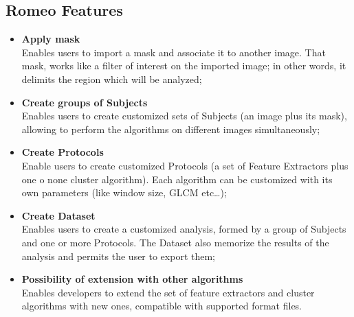 \subsection{Romeo Features}
\label{features}
\begin{itemize}
\item \textbf{Apply mask\\} Enables users to import a mask and associate it to another image. That mask, works like a filter of interest on the imported image; in other words, it delimits the region which will be analyzed;
\item \textbf{Create groups of Subjects\\} Enables users to create customized sets of Subjects\g{} (an image plus its mask), allowing to perform the algorithms on different images simultaneously;
\item \textbf{Create Protocols\\} Enable users to create customized Protocols\g{} (a set of Feature Extractors plus one o none cluster algorithm\g{}). Each algorithm can be customized with its own parameters (like window size, GLCM etc\dots{});
\item \textbf{Create Dataset\\} Enables users to create a customized analysis, formed by a group of Subjects\g{} and one or more Protocols\g{}. The Dataset\g{} also memorize the results of the analysis and permits the user to export them;
\item \textbf{Possibility of extension with other algorithms\\} Enables developers to extend the set of feature extractors and cluster algorithms with new ones, compatible with supported format files. 
\end{itemize}